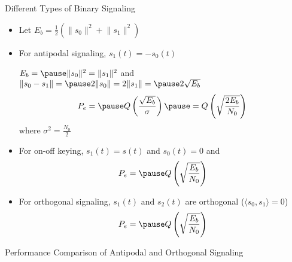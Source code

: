 \documentclass[t]{beamer}
\begin{document}
\begin{frame}{Different Types of Binary Signaling}
  \footnotesize
  \begin{itemize}
    \item \pause Let $E_b = \frac{1}{2}\left( \lVert s_0 \rVert^2 + \lVert s_1 \rVert^2 \right)$
    \item \pause For antipodal signaling, $s_1(t) = -s_0(t)$ \pause

    $E_b = \pause \lVert s_0 \rVert^2 = \lVert s_1 \rVert^2$ \pause and $\lVert s_0 - s_1 \rVert = \pause 2\lVert s_0 \rVert = 2\lVert s_1 \rVert = \pause 2\sqrt{E_b}$ \pause
      \begin{eqnarray*}
        P_e = \pause Q\left(\frac{\sqrt{E_b}}{\sigma} \right) \pause = Q\left(\sqrt{\frac{2E_b}{N_0} }\right)
      \end{eqnarray*}
      where $\sigma^2 = \frac{N_0}{2}$
    \item \pause For on-off keying, $s_1(t) = s(t)$ and $s_0(t) = 0$ and
    \begin{eqnarray*}
      P_e = \pause Q\left(\sqrt{\frac{E_b}{N_0} }\right)
    \end{eqnarray*}
    \item \pause For orthogonal signaling, $s_1(t)$ and $s_2(t)$ are orthogonal ($\langle s_0, s_1 \rangle = 0$)
    \begin{eqnarray*}
      P_e = \pause Q\left(\sqrt{\frac{E_b}{N_0} }\right)
    \end{eqnarray*}
  \end{itemize}
  \normalsize
\end{frame}

\begin{frame}{Performance Comparison of Antipodal and Orthogonal Signaling}
  \footnotesize
  \begin{figure}
    \centering
  \end{figure}
  \normalsize
\end{frame}
\end{document}
